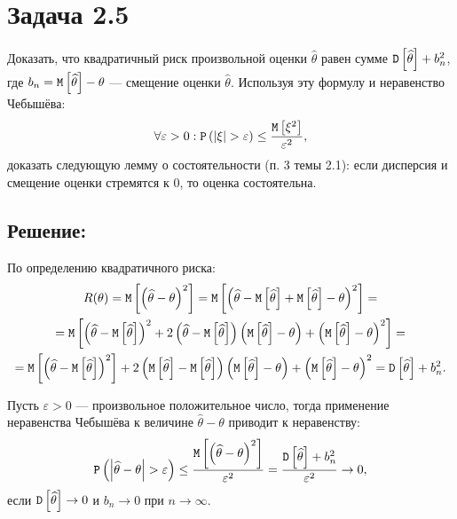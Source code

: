 \documentclass[12pt]{article}
\begin{document}
    \section*{Задача 2.5}
    Доказать, что квадратичный риск произвольной оценки $\widehat{\theta}$ равен сумме $\mathtt{D} \left [ \widehat{\theta} \right ] + b_n^2$, где $b_n = \mathtt{M} \left [ \widehat{\theta} \right ] - \theta$ ---
    смещение оценки $\widehat{\theta}$. Используя эту формулу и неравенство Чебышёва:
    \[
        \forall \varepsilon > 0 : \mathtt{P} \left ( \left | \xi \right | > \varepsilon \right ) \le \frac{\mathtt{M} \left [ \xi^2 \right ]}{\varepsilon^2},
    \]
    доказать следующую лемму о состоятельности (п. 3 темы 2.1): если дисперсия и смещение оценки стремятся к 0, то оценка состоятельна.

    \subsection*{Решение:}
    По определению квадратичного риска:
    \begin{multline*}
        R(\theta)
        = \mathtt{M} \left [ \left ( \widehat{\theta} - \theta \right )^2 \right ]
        = \mathtt{M} \left [ \left ( \widehat{\theta} - \mathtt{M} \left [ \widehat{\theta} \right ] + \mathtt{M} \left [ \widehat{\theta} \right ] - \theta \right )^2 \right ] = \\
        = \mathtt{M} \left [ \left ( \widehat{\theta} - \mathtt{M} \left [ \widehat{\theta} \right ] \right )^2 + 2 \left ( \widehat{\theta} - \mathtt{M} \left [ \widehat{\theta} \right ] \right ) \left ( \mathtt{M} \left [ \widehat{\theta} \right ] - \theta \right ) + \left ( \mathtt{M} \left [ \widehat{\theta} \right ] - \theta \right )^2 \right ] = \\
        = \mathtt{M} \left [ \left ( \widehat{\theta} - \mathtt{M} \left [ \widehat{\theta} \right ] \right )^2 \right ] + 2 \left ( \mathtt{M} \left [ \widehat{\theta} \right ] - \mathtt{M} \left [ \widehat{\theta} \right ] \right ) \left ( \mathtt{M} \left [ \widehat{\theta} \right ] - \theta \right ) + \left ( \mathtt{M} \left [ \widehat{\theta} \right ] - \theta \right )^2
        = \mathtt{D} \left [ \widehat{\theta} \right ] + b_n^2 .
    \end{multline*}

    Пусть $\varepsilon > 0$ --- произвольное положительное число, тогда применение неравенства Чебышёва к величине $\widehat{\theta} - \theta$ приводит к неравенству:
    \[
        \mathtt{P} \left ( \left | \widehat{\theta} - \theta \right | > \varepsilon \right )
        \le \frac{\mathtt{M} \left [ \left ( \widehat{\theta} - \theta \right )^2 \right ]}{\varepsilon^2}
        = \frac{\mathtt{D} \left [ \widehat{\theta} \right ] + b_n^2}{\varepsilon^2}
        \rightarrow 0 ,
    \]
    если $\mathtt{D} \left [ \widehat{\theta} \right ] \rightarrow 0$ и $b_n \rightarrow 0$ при $n \rightarrow \infty$.
\end{document}
